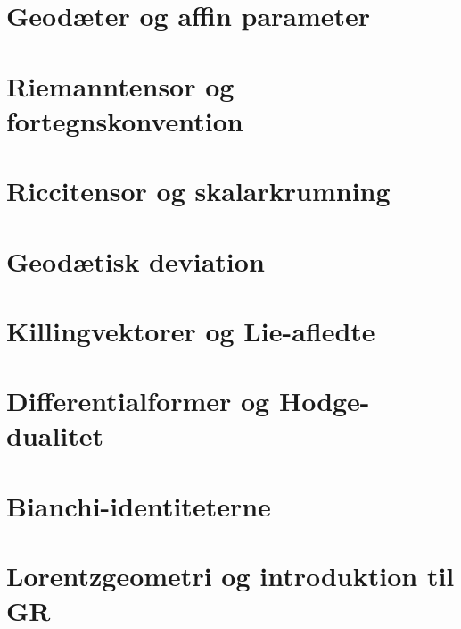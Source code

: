 \section{Geodæter og affin parameter}
\leavevmode\par

\section{Riemanntensor og fortegnskonvention}
\leavevmode\par

\section{Riccitensor og skalarkrumning}
\leavevmode\par

\section{Geodætisk deviation}
\leavevmode\par

\section{Killingvektorer og Lie-afledte}
\leavevmode\par

\section{Differentialformer og Hodge-dualitet}
\leavevmode\par

\section{Bianchi-identiteterne}
\leavevmode\par

\section{Lorentzgeometri og introduktion til GR}
\leavevmode\par
